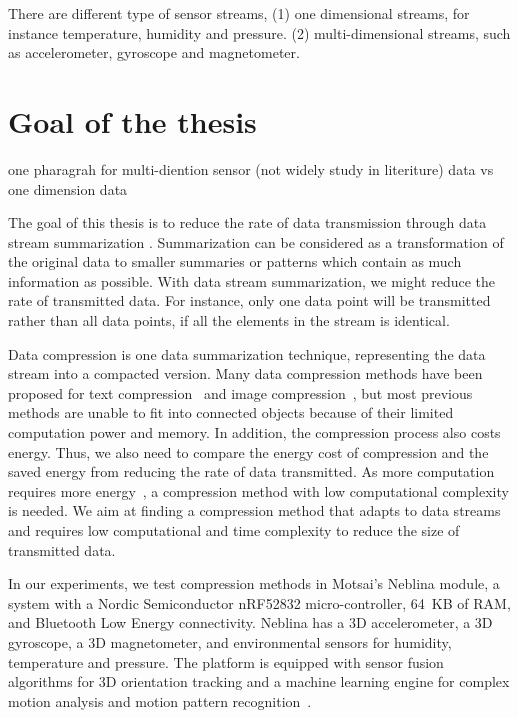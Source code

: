 There are different type of sensor streams, (1) one dimensional streams, for instance temperature, humidity and pressure. (2) multi-dimensional streams, such as accelerometer, gyroscope and magnetometer. 



\section{Goal of the thesis}


one pharagrah for multi-diention sensor (not widely study in literiture) data vs one dimension data


The goal of this thesis is to reduce the rate of data transmission through data
stream summarization .
Summarization can be considered as a transformation of the
original data to smaller summaries or patterns which contain as much information as
possible. With data stream summarization, we might reduce the
rate of transmitted data. For instance, only one data point will be transmitted
rather than all data points, if all the elements in the stream is identical. 

Data compression is one data summarization technique, representing
the data stream into a compacted version. Many data compression methods have
been proposed for text compression~\cite{shanmugasundaram2011comparative,
sayood2017introduction} and image compression~\cite{shum2003survey,
zaineldin2015image}, but most previous methods are unable to fit into
connected objects because of their limited computation power and memory.
 In addition, the compression process also costs energy. Thus, we also
need to compare the energy cost of compression and the saved energy from
reducing the rate of data transmitted. As more computation requires more
energy~\cite{pope2018accelerometer}, a
compression method with low computational complexity is needed. We aim at finding a
compression method that adapts to data streams and requires low computational and
time complexity to reduce the size of transmitted data.


In our experiments, we test compression methods in Motsai's Neblina module, a
system with a Nordic Semiconductor nRF52832 micro-controller, 64~KB of RAM, and
Bluetooth Low Energy connectivity. Neblina has a 3D accelerometer, a 3D
gyroscope, a 3D magnetometer, and environmental sensors for humidity,
temperature and pressure. The platform is equipped with sensor fusion algorithms
for 3D orientation tracking and a machine learning engine for complex motion
analysis and motion pattern recognition~\cite{sarbishei2016accuracy}.



